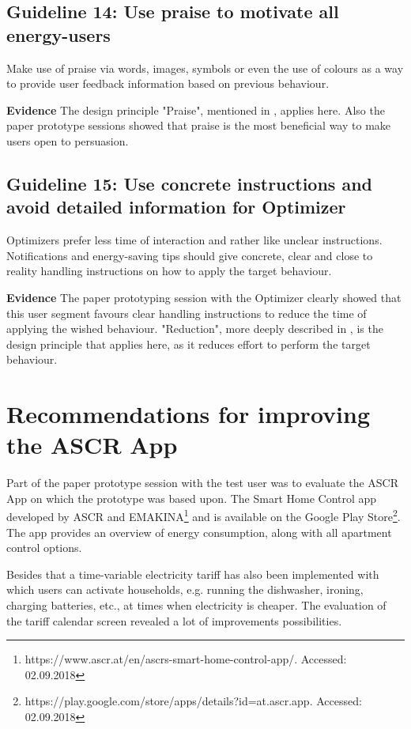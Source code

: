 \subsection*{Guideline 14: Use praise to motivate all energy-users}

Make use of praise via words, images, symbols or even the use of colours as a way to provide user feedback information based on previous behaviour.

\textbf{Evidence} \quad The design principle "Praise", mentioned in , applies here. Also the paper prototype sessions showed that praise is the most beneficial way to make users open to persuasion.


\subsection*{Guideline 15: Use concrete instructions and avoid detailed information for Optimizer }

Optimizers prefer less time of interaction and rather like unclear instructions. Notifications and energy-saving tips should give concrete, clear and close to reality handling instructions on how to apply the target behaviour.

\textbf{Evidence} \quad The paper prototyping session with the Optimizer clearly showed that this user segment favours clear handling instructions to reduce the time of applying the wished behaviour. "Reduction", more deeply described in , is the design principle that applies here, as it reduces effort to perform the target behaviour.


\section{Recommendations for improving the ASCR App}

Part of the paper prototype session with the test user was to evaluate the ASCR App on which the prototype was based upon. The Smart Home Control app developed by ASCR and EMAKINA\footnote{https://www.ascr.at/en/ascrs-smart-home-control-app/. Accessed: 02.09.2018} and is available on the Google Play Store\footnote{https://play.google.com/store/apps/details?id=at.ascr.app. Accessed: 02.09.2018}. The app provides an overview of energy consumption, along with all apartment control options. 

Besides that a time-variable electricity tariff has also been implemented with which users can activate households, e.g. running the dishwasher, ironing, charging batteries, etc., at times when electricity is cheaper. The evaluation of the tariff calendar screen revealed a lot of improvements possibilities.


